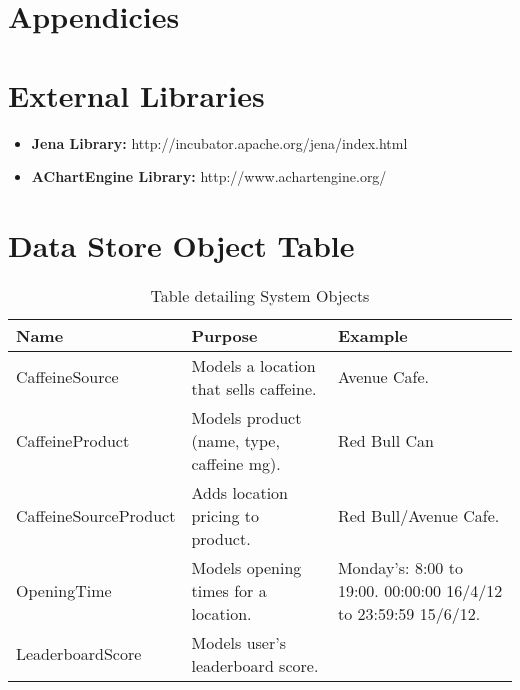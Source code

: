 \section*{Appendicies}
\section{External Libraries}
\label{sec:Support}

\begin{itemize}
	\item{\textbf{Jena Library:} http://incubator.apache.org/jena/index.html}
	\item{\textbf{AChartEngine Library:} http://www.achartengine.org/}
\end{itemize}

\section{Data Store Object Table}
\label{sec:DataStore}
\begin{table}[ht]
\caption{Table detailing System Objects}
\label{tab:DataTable}
\begin{tabular}{|p{106pt}|p{200pt}|p{118pt}|}
\hline
	Name			
	& Purpose		 									
	& Example	
\\\hline
	CaffeineSource		
	& Models a location that sells caffeine.	
	& Avenue Cafe.
\\\hline
	CaffeineProduct	
	& Models product (name, type, caffeine mg).
	& Red Bull Can
\\\hline
	CaffeineSourceProduct	
	& Adds location pricing to product. 
	& Red Bull/Avenue Cafe.
\\\hline
	OpeningTime		
	& Models opening times for a location.	
	& Monday’s: 8:00 to 19:00. 00:00:00 16/4/12 to 23:59:59 15/6/12. 
\\\hline
	LeaderboardScore	
	& Models user's leaderboard score.	
	&
\\\hline
\end{tabular}
\end{table}